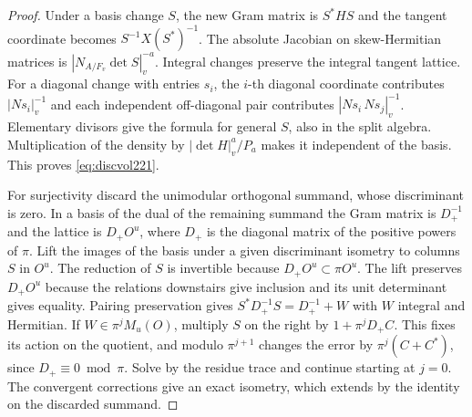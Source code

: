\documentclass[a4paper,11pt]{article}
\theoremstyle{definition}
\theoremstyle{remark}
\numberwithin{equation}{section}
\begin{document}
\begin{proof}
Under a basis change \(S\), the new Gram matrix is \(S^*HS\)
and the tangent coordinate becomes \(S^{-1}X(S^*)^{-1}\).
The absolute Jacobian on skew-Hermitian matrices is
\(|N_{A/F_v}\det S|_v^{-a}\). Integral changes preserve the
integral tangent lattice. For a diagonal change with entries
\(s_i\), the \(i\)-th diagonal coordinate contributes
\(|N s_i|_v^{-1}\) and each independent off-diagonal pair
contributes \(|N s_i\,N s_j|_v^{-1}\). Elementary divisors
give the formula for general \(S\), also in the split algebra.
Multiplication of the density by \(|\det H|_v^a/P_a\)
makes it independent of the basis. This proves
\eqref{eq:discvol221}.

For surjectivity discard the unimodular orthogonal summand,
whose discriminant is zero. In a basis of the dual of the
remaining summand the Gram matrix is \(D_+^{-1}\) and the
lattice is \(D_+O^u\), where \(D_+\) is the diagonal matrix
of the positive powers of \(\pi\). Lift the images of the
basis under a given discriminant isometry to columns \(S\)
in \(O^u\). The reduction of \(S\) is invertible because
\(D_+O^u\subset\pi O^u\). The lift preserves \(D_+O^u\)
because the relations downstairs give inclusion and its unit
determinant gives equality. Pairing preservation gives
\(S^*D_+^{-1}S=D_+^{-1}+W\) with \(W\) integral and
Hermitian. If \(W\in\pi^j M_u(O)\), multiply \(S\) on the
right by \(1+\pi^jD_+C\). This fixes its action on the
quotient, and modulo \(\pi^{j+1}\) changes the error by
\(\pi^j(C+C^*)\), since \(D_+\equiv0\bmod\pi\). Solve by
the residue trace and continue starting at \(j=0\). The
convergent corrections give an exact isometry, which extends
by the identity on the discarded summand.
\end{proof}
\end{document}
